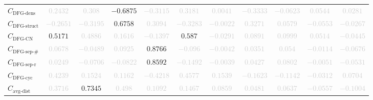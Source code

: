 \documentclass{standalone}
\newcommand{\dfgdensname}{\text{DFG-dens}}
\newcommand{\dfgdens}{C_{\dfgdensname}}
\newcommand{\dfgstructname}{\text{DFG-struct}}
\newcommand{\dfgstruct}{C_{\dfgstructname}}
\newcommand{\dfgcycnumbername}{\text{DFG-CN}}
\newcommand{\dfgcycnumber}{C_{\dfgcycnumbername}}
\newcommand{\dfgsepnumname}{\text{DFG-sep-\#}}
\newcommand{\dfgsepnum}{C_{\dfgsepnumname}}
\newcommand{\dfgseprationame}{\text{DFG-sep-r}}
\newcommand{\dfgsepratio}{C_{\dfgseprationame}}
\newcommand{\dfgcycname}{\text{DFG-cyc}}
\newcommand{\dfgcyc}{C_{\dfgcycname}}
\newcommand{\avgdistname}{\text{avg-dist}}
\newcommand{\avgdist}{C_{\avgdistname}}
\begin{document}
\begin{tabular}{lcccccccccc}
$\dfgdens$ & \textcolor{lightgray}{$0.2432$} & \textcolor{lightgray}{$0.308$} & $-0.6875$ & \textcolor{lightgray}{$-0.3115$} & \textcolor{lightgray}{$0.3181$} & \textcolor{lightgray}{$0.0041$} & \textcolor{lightgray}{$-0.3333$} & \textcolor{lightgray}{$-0.0623$} & \textcolor{lightgray}{$0.0544$} & \textcolor{lightgray}{$0.0281$} \\ 
$\dfgstruct$ & \textcolor{lightgray}{$-0.2651$} & \textcolor{lightgray}{$-0.3195$} & $0.6758$ & \textcolor{lightgray}{$0.3094$} & \textcolor{lightgray}{$-0.3283$} & \textcolor{lightgray}{$-0.0022$} & \textcolor{lightgray}{$0.3271$} & \textcolor{lightgray}{$0.0579$} & \textcolor{lightgray}{$-0.0553$} & \textcolor{lightgray}{$-0.0267$} \\ 
$\dfgcycnumber$ & $0.5171$ & \textcolor{lightgray}{$0.4886$} & \textcolor{lightgray}{$0.1616$} & \textcolor{lightgray}{$-0.1397$} & $0.587$ & \textcolor{lightgray}{$-0.0291$} & \textcolor{lightgray}{$0.0891$} & \textcolor{lightgray}{$0.0999$} & \textcolor{lightgray}{$0.0514$} & \textcolor{lightgray}{$-0.0445$} \\ 
$\dfgsepnum$ & \textcolor{lightgray}{$0.0678$} & \textcolor{lightgray}{$-0.0489$} & \textcolor{lightgray}{$0.0925$} & $0.8766$ & \textcolor{lightgray}{$-0.096$} & \textcolor{lightgray}{$-0.0042$} & \textcolor{lightgray}{$0.0351$} & \textcolor{lightgray}{$0.054$} & \textcolor{lightgray}{$-0.0114$} & \textcolor{lightgray}{$-0.0676$} \\ 
$\dfgsepratio$ & \textcolor{lightgray}{$0.0249$} & \textcolor{lightgray}{$-0.0706$} & \textcolor{lightgray}{$-0.0822$} & $0.8592$ & \textcolor{lightgray}{$-0.1492$} & \textcolor{lightgray}{$-0.0039$} & \textcolor{lightgray}{$0.0427$} & \textcolor{lightgray}{$0.0802$} & \textcolor{lightgray}{$-0.0051$} & \textcolor{lightgray}{$-0.0531$} \\ 
$\dfgcyc$ & \textcolor{lightgray}{$0.4239$} & \textcolor{lightgray}{$0.1524$} & \textcolor{lightgray}{$0.1162$} & \textcolor{lightgray}{$-0.4218$} & \textcolor{lightgray}{$0.4577$} & \textcolor{lightgray}{$0.1539$} & \textcolor{lightgray}{$-0.1623$} & \textcolor{lightgray}{$-0.1142$} & \textcolor{lightgray}{$-0.0312$} & \textcolor{lightgray}{$0.0704$} \\ 
$\avgdist$ & \textcolor{lightgray}{$0.3716$} & $0.7345$ & \textcolor{lightgray}{$0.498$} & \textcolor{lightgray}{$0.1092$} & \textcolor{lightgray}{$0.1467$} & \textcolor{lightgray}{$0.0859$} & \textcolor{lightgray}{$0.0481$} & \textcolor{lightgray}{$0.0637$} & \textcolor{lightgray}{$-0.0557$} & \textcolor{lightgray}{$-0.1004$} \\ 
\bottomrule
\end{tabular}
\end{document}
